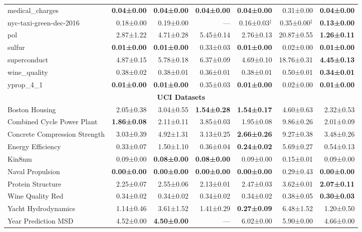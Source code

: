 \begin{table}[h!]
{\begin{tabular}{lrrrrrr}
      medical\_charges & \textbf{0.04±0.00} & \textbf{0.04±0.00} & \textbf{0.04±0.00} & \textbf{0.04±0.00} & 0.31±0.00 & \textbf{0.04±0.00} \\
      nyc-taxi-green-dec-2016 & 0.18±0.00 & 0.19±0.00 & --- & 0.16±0.03$^{\ddagger}$ & 0.35±0.00$^{\ddagger}$ & \textbf{0.13±0.00} \\
      pol & 2.87±1.22 & 4.71±0.28 & 5.45±0.14 & 2.76±0.13 & 20.87±0.55 & \textbf{1.26±0.11} \\
      sulfur & \textbf{0.01±0.00} & \textbf{0.01±0.00} & 0.33±0.03 & \textbf{0.01±0.00} & 0.02±0.00 & \textbf{0.01±0.00} \\
      superconduct & 4.87±0.15 & 5.78±0.18 & 6.37±0.09 & 4.69±0.10 & 18.76±0.31 & \textbf{4.45±0.13} \\
      wine\_quality & 0.38±0.02 & 0.38±0.01 & 0.36±0.01 & 0.38±0.01 & 0.50±0.01 & \textbf{0.34±0.01} \\
      yprop\_4\_1 & \textbf{0.01±0.00} & \textbf{0.01±0.00} & 0.35±0.03 & \textbf{0.01±0.00} & 0.02±0.00 & \textbf{0.01±0.00} \\
      \midrule
      \multicolumn{7}{c}{\textbf{UCI Datasets}} \\
      \midrule
      Boston Housing & 2.05±0.38 & 3.04±0.55 & \textbf{1.54±0.28} & \textbf{1.54±0.17} & 4.60±0.63 & 2.32±0.53 \\
      Combined Cycle Power Plant & \textbf{1.86±0.08} & 2.11±0.11 & 3.85±0.03 & 1.95±0.08 & 9.86±0.26 & 2.01±0.09 \\
      Concrete Compression Strength & 3.03±0.39 & 4.92±1.31 & 3.13±0.25 & \textbf{2.66±0.26} & 9.27±0.38 & 3.48±0.26 \\
      Energy Efficiency & 0.33±0.07 & 1.50±1.10 & 0.36±0.04 & \textbf{0.24±0.02} & 5.69±0.27 & 0.54±0.13 \\
      Kin8nm & 0.09±0.00 & \textbf{0.08±0.00} & \textbf{0.08±0.00} & 0.09±0.00 & 0.15±0.01 & 0.09±0.00 \\
      Naval Propulsion & \textbf{0.00±0.00} & \textbf{0.00±0.00} & \textbf{0.00±0.00} & \textbf{0.00±0.00} & 0.29±0.43 & \textbf{0.00±0.00} \\
      Protein Structure & 2.25±0.07 & 2.55±0.06 & 2.13±0.01 & 2.47±0.03 & 3.62±0.01 & \textbf{2.07±0.11} \\
      Wine Quality Red & 0.34±0.02 & 0.34±0.02 & 0.34±0.02 & 0.34±0.02 & 0.38±0.05 & \textbf{0.30±0.03} \\
      Yacht Hydrodynamics & 1.14±0.46 & 3.61±1.52 & 1.41±0.29 & \textbf{0.27±0.09} & 6.48±1.52 & 1.20±0.50 \\
      Year Prediction MSD & 4.52±0.00 & \textbf{4.50±0.00} & --- & 6.02±0.00 & 5.90±0.00 & 4.66±0.00 \\
      \bottomrule
      \end{tabular}%
    }
\end{table}
